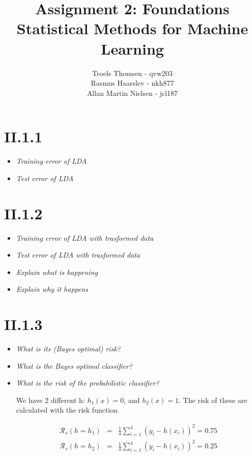 \documentclass[12pt, a4paper]{article}
\title{Assignment 2: Foundations\\Statistical Methods for Machine Learning}
\author{Troels Thomsen - qvw203\\Rasmus Haarslev - nkh877\\Allan Martin Nielsen - jcl187}
\begin{document}
\pagestyle{empty}
\maketitle
{}
\newpage

\tableofcontents
\newpage

\pagestyle{fancy}

\section{II.1.1}
\begin{itemize}
\item \textit{Training error of LDA}
\item \textit{Test error of LDA}
\end{itemize}

\section{II.1.2}
\begin{itemize}
\item \textit{Training error of LDA with trasformed data}
\item \textit{Test error of LDA with trasformed data}
\item \textit{Explain what is happening}
\item \textit{Explain why it happens}
\end{itemize}

\section{II.1.3}
\begin{itemize}
\item \textit{What is its (Bayes optimal) risk?}
\item \textit{What is the Bayes optimal classifier?}
\item \textit{What is the risk of the probabilistic classifier?}

We have 2 different h: $h_1(x) = 0$, and $h_2(x) = 1$. The risk of these are calculated with the risk function

\begin{eqnarray}
	\mathcal{R}_s(h = h_1) &=& \frac{1}{4} \sum^4_{i=1} (y_i - h(x_i))^2 = 0.75 \\
	\mathcal{R}_s(h = h_2) &=& \frac{1}{4} \sum^4_{i=1} (y_i - h(x_i))^2 = 0.25
\end{eqnarray}

\end{itemize}
\end{document}
